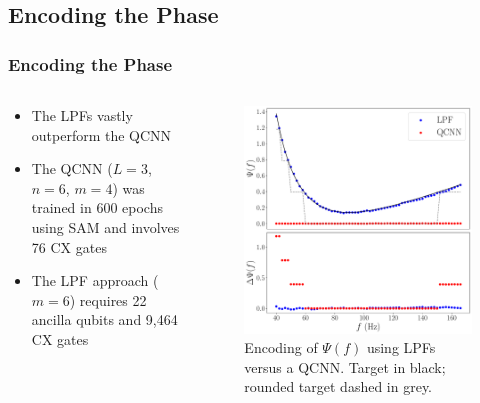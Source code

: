 \documentclass{beamer}
\begin{document}
\subsection{Encoding the Phase}
\begin{frame}
\frametitle{Encoding the Phase}
\begin{columns}
\begin{column}{0.5\textwidth}
\begin{itemize}
\item The \alert{LPFs vastly outperform} the QCNN
\item The QCNN ($L=3$, $n=6$, $m=4$) was trained in 600 epochs using SAM and involves 76 CX gates 
\item The LPF approach ($m=6$) requires 22 ancilla qubits and 9,464 CX gates 
\end{itemize}
\end{column}
\begin{column}{0.5\textwidth}  
\begin{figure}[h]
\centering
\includegraphics[width=\textwidth]{im/phase_comp}
\caption{Encoding of $\Psi(f)$ using LPFs versus a QCNN. Target in black; rounded target dashed in grey.}
\end{figure}
\end{column}
\end{columns}
\end{frame}
\end{document}
